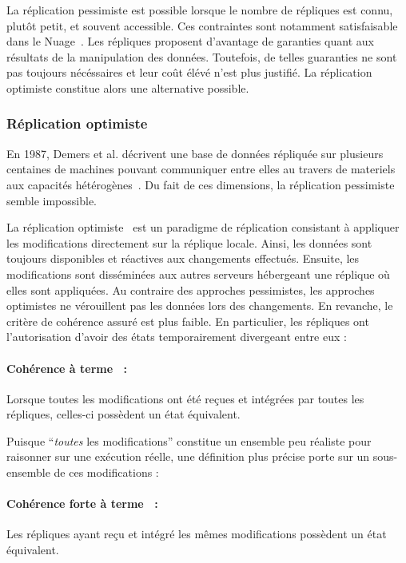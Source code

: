 La réplication pessimiste est possible lorsque le nombre de répliques est connu,
plutôt petit, et souvent accessible. Ces contraintes sont notamment
satisfaisable dans le Nuage~\cite{mell2011national}. Les répliques proposent
d'avantage de garanties quant aux résultats de la manipulation des
données. Toutefois, de telles guaranties ne sont pas toujours nécéssaires et
leur coût élévé n'est plus justifié. La réplication optimiste constitue alors
une alternative possible.

\subsubsection{Réplication optimiste}
\label{repl:subsubsec:optimistic}

En 1987, Demers et al. décrivent une base de données répliquée sur plusieurs
centaines de machines pouvant communiquer entre elles au travers de materiels
aux capacités hétérogènes~\cite{demers1987epidemic}. Du fait de ces dimensions,
la réplication pessimiste semble impossible.

La réplication optimiste~\cite{johnson1975maintenance, saito2005optimistic} est
un paradigme de réplication consistant à appliquer les modifications directement
sur la réplique locale.  Ainsi, les données sont toujours disponibles et
réactives aux changements effectués. Ensuite, les modifications sont disséminées
aux autres serveurs hébergeant une réplique où elles sont appliquées. Au
contraire des approches pessimistes, les approches optimistes ne vérouillent pas
les données lors des changements. En revanche, le critère de cohérence assuré
est plus faible. En particulier, les répliques ont l'autorisation d'avoir des
états temporairement divergeant entre eux :


\paragraph{Cohérence à terme~\cite{bailis2013eventual} :} Lorsque toutes les
modifications ont été reçues et intégrées par toutes les répliques, celles-ci
possèdent un état équivalent.

\noindent Puisque ``\emph{toutes} les modifications'' constitue un ensemble peu
réaliste pour raisonner sur une exécution réelle, une définition plus précise
porte sur un sous-ensemble de ces modifications :

\paragraph{Cohérence forte à terme~\cite{shapiro2011conflict} :} Les répliques
ayant reçu et intégré les mêmes modifications possèdent un état équivalent.



